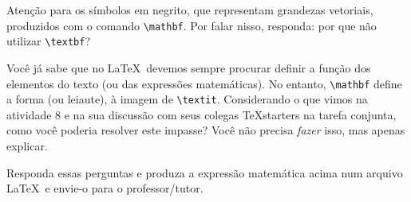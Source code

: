 \documentclass[a4paper,10pt,twocolumn,landscape]{article}
\begin{document}
	Atenção para os símbolos em negrito, que representam grandezas vetoriais, produzidos com o comando \verb|\mathbf|. Por falar nisso, responda: por que não utilizar \verb|\textbf|? 

	Você já sabe que no \LaTeX\ devemos sempre procurar definir a função dos elementos do texto (ou das expressões matemáticas). No entanto, \verb|\mathbf| define a forma (ou leiaute), à imagem de \verb|\textit|. Considerando o que vimos na atividade 8 e na sua discussão com seus colegas \TeX starters na tarefa conjunta, como você poderia resolver este impasse? Você não precisa \emph{fazer} isso, mas apenas explicar.

	Responda essas perguntas e produza a expressão matemática acima num arquivo \LaTeX\ e envie-o para o professor/tutor.
\end{document}
